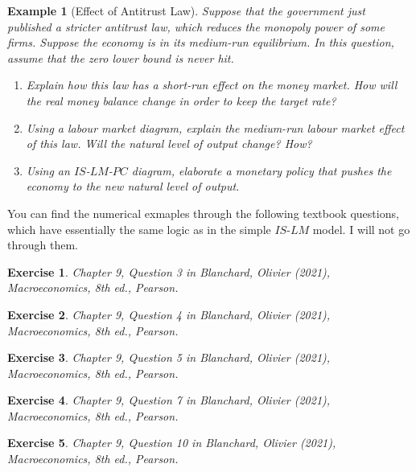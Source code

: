 \documentclass[12pt]{article}
\newtheorem{example}{Example}
\newtheorem{exercise}{Exercise}
\begin{document}
\begin{example}[Effect of Antitrust Law]
  Suppose that the government just published a stricter antitrust law, which reduces the monopoly power of some firms. Suppose the economy is in its medium-run equilibrium. In this question, assume that the zero lower bound is never hit.
  \begin{enumerate}
    \item Explain how this law has a short-run effect on the money market. How will the real money balance change in order to keep the target rate?
    \vspace{80pt}
    \item Using a labour market diagram, explain the medium-run labour market effect of this law. Will the natural level of output change? How?
    \vspace{80pt}
    \item Using an $IS$-$LM$-$PC$ diagram, elaborate a monetary policy that pushes the economy to the new natural level of output. 
    \vspace{180pt}
  \end{enumerate}
\end{example}


You can find the numerical exmaples through the following textbook questions, which have essentially the same logic as in the simple $IS$-$LM$ model. I will not go through them.

\begin{exercise}
  Chapter 9, Question 3 in Blanchard, Olivier (2021), \textit{Macroeconomics}, 8th ed., Pearson.
\end{exercise}

\begin{exercise}
  Chapter 9, Question 4 in Blanchard, Olivier (2021), \textit{Macroeconomics}, 8th ed., Pearson.
\end{exercise}

\begin{exercise}
  Chapter 9, Question 5 in Blanchard, Olivier (2021), \textit{Macroeconomics}, 8th ed., Pearson.
\end{exercise}

\begin{exercise}
  Chapter 9, Question 7 in Blanchard, Olivier (2021), \textit{Macroeconomics}, 8th ed., Pearson.
\end{exercise}

\begin{exercise}
  Chapter 9, Question 10 in Blanchard, Olivier (2021), \textit{Macroeconomics}, 8th ed., Pearson.
\end{exercise}
\end{document}
